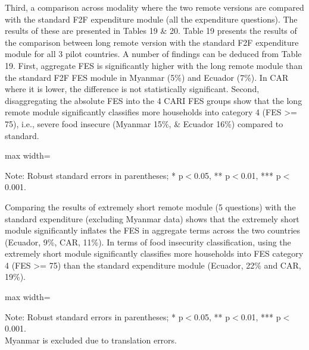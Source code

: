 \documentclass[11pt,harvard]{article}
\begin{document}
Third, a comparison across modality where the two remote versions are compared with the standard F2F expenditure module (all the expenditure questions). The results of these are presented in Tables 19 \& 20. Table 19 presents the results of the comparison between long remote version with the standard F2F expenditure module for all 3 pilot countries. A number of findings can be deduced from Table 19. First, aggregate FES is significantly higher with the long remote module than the standard F2F FES module in Myanmar (5\%) and Ecuador (7\%). In CAR where it is lower, the difference is not statistically significant. Second, disaggregating the absolute FES into the 4 CARI FES groups show that the long remote module significantly classifies more households into category 4 (FES >= 75), i.e., severe food insecure (Myanmar 15\%, \& Ecuador 16\%) compared to standard. 

\begin{table}[htbp]
	\centering
	\begin{adjustbox}{max width=\textwidth}
		\begin{threeparttable}
			\caption{Impact of Module Length on Expenditure and FES: F2F vs. Remote Long}
			\scriptsize
			 
			\label{tab:FES_F2F_Long_All_Country}
			\begin{tablenotes}
				\item Note: Robust standard errors in parentheses; * p$<$0.05, ** p$<$0.01, *** p$<$0.001. 
			\end{tablenotes}
		\end{threeparttable}
	\end{adjustbox}
\end{table}

Comparing the results of extremely short remote module (5 questions) with the standard expenditure (excluding Myanmar data) shows that the extremely short module significantly inflates the FES in aggregate terms across the two countries (Ecuador, 9\%, CAR, 11\%). In terms of food insecurity classification, using the extremely short module significantly classifies more households into FES category 4 (FES >= 75) than the standard expenditure module (Ecuador, 22\% and CAR, 19\%).

\begin{table}[htbp]
	\centering
	\begin{adjustbox}{max width=\textwidth}
		\begin{threeparttable}
			\caption{Impact of Module Length on Expenditure and FES: F2F vs. Remote Short}
			\scriptsize
			 
			\label{tab:FES_F2F_Short_ECU_CAR}
			\begin{tablenotes}
				\item Note: Robust standard errors in parentheses; * p$<$0.05, ** p$<$0.01, *** p$<$0.001. \\
				Myanmar is excluded due to translation errors.
			\end{tablenotes}
		\end{threeparttable}
	\end{adjustbox}
\end{table}
\end{document}

